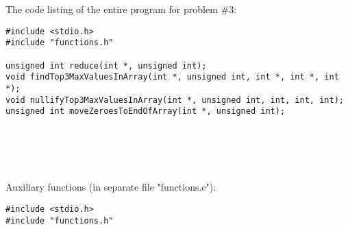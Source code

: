 \documentclass{article}
\begin{document}
\paragraph{}\
\paragraph{}\
\paragraph{}\	
\paragraph{}\	
\paragraph{}\
\paragraph{}\	

	
		\rmfamily
		\noindent The code listing of the entire program for problem \#3:
		\begin{verbatim}
#include <stdio.h>
#include "functions.h"

unsigned int reduce(int *, unsigned int);
void findTop3MaxValuesInArray(int *, unsigned int, int *, int *, int *);
void nullifyTop3MaxValuesInArray(int *, unsigned int, int, int, int);
unsigned int moveZeroesToEndOfArray(int *, unsigned int);
		\end{verbatim}
		
		
\paragraph{}\
\paragraph{}\

	\rmfamily
	\noindent Auxiliary functions (in separate file "functions.c"):	
	\begin{verbatim} 
#include <stdio.h>
#include "functions.h"
	\end{verbatim}
		
\paragraph{}\
\paragraph{}\
		
\end{document}

